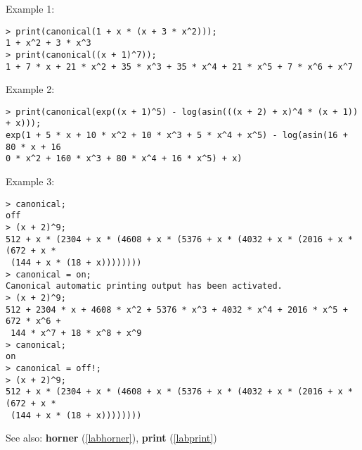 \noindent Example 1: 
\begin{center}\begin{minipage}{15cm}\begin{Verbatim}[frame=single]
> print(canonical(1 + x * (x + 3 * x^2)));
1 + x^2 + 3 * x^3
> print(canonical((x + 1)^7));
1 + 7 * x + 21 * x^2 + 35 * x^3 + 35 * x^4 + 21 * x^5 + 7 * x^6 + x^7
\end{Verbatim}
\end{minipage}\end{center}
\noindent Example 2: 
\begin{center}\begin{minipage}{15cm}\begin{Verbatim}[frame=single]
> print(canonical(exp((x + 1)^5) - log(asin(((x + 2) + x)^4 * (x + 1)) + x)));
exp(1 + 5 * x + 10 * x^2 + 10 * x^3 + 5 * x^4 + x^5) - log(asin(16 + 80 * x + 16
0 * x^2 + 160 * x^3 + 80 * x^4 + 16 * x^5) + x)
\end{Verbatim}
\end{minipage}\end{center}
\noindent Example 3: 
\begin{center}\begin{minipage}{15cm}\begin{Verbatim}[frame=single]
> canonical;
off
> (x + 2)^9;
512 + x * (2304 + x * (4608 + x * (5376 + x * (4032 + x * (2016 + x * (672 + x *
 (144 + x * (18 + x))))))))
> canonical = on;
Canonical automatic printing output has been activated.
> (x + 2)^9;
512 + 2304 * x + 4608 * x^2 + 5376 * x^3 + 4032 * x^4 + 2016 * x^5 + 672 * x^6 +
 144 * x^7 + 18 * x^8 + x^9
> canonical;
on
> canonical = off!;
> (x + 2)^9;
512 + x * (2304 + x * (4608 + x * (5376 + x * (4032 + x * (2016 + x * (672 + x *
 (144 + x * (18 + x))))))))
\end{Verbatim}
\end{minipage}\end{center}
See also: \textbf{horner} (\ref{labhorner}), \textbf{print} (\ref{labprint})
